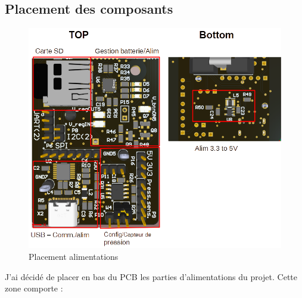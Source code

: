 \subsection{Placement des composants} \label{ssec:placementComp}
{
\begin{figure}[h]
	\centering
	\includegraphics[width=0.87\linewidth]{Figures/BasPCB}
	\caption{Placement alimentations}
	\label{fig:baspcb}
\end{figure}

J'ai décidé de placer en bas du PCB les parties d'alimentations du projet. Cette zone comporte :

}
